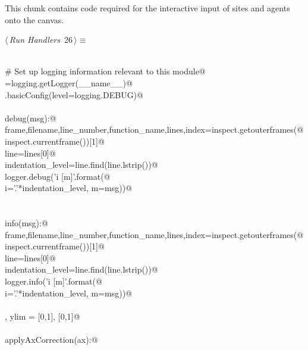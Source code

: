 \documentclass[10pt, english, oneside]{report}
\begin{document}
\begin{appendices}
This chunk contains code required for the interactive input of sites and agents onto the canvas. 

\begin{flushleft} \small\label{scrap25}\raggedright\small
{} $\langle\,${\itshape Run Handlers}\nobreak\ {\footnotesize {26}}$\,\rangle\equiv$
\vspace{-1ex}
\begin{list}{}{} \item
\mbox{}\verb@@\\
\mbox{}\verb@# Set up logging information relevant to this module@\\
\mbox{}\verb@logger=logging.getLogger(__name__)@\\
\mbox{}\verb@logging.basicConfig(level=logging.DEBUG)@\\
\mbox{}\verb@@\\
\mbox{}\verb@def debug(msg):@\\
\mbox{}\verb@    frame,filename,line_number,function_name,lines,index=inspect.getouterframes(@\\
\mbox{}\verb@        inspect.currentframe())[1]@\\
\mbox{}\verb@    line=lines[0]@\\
\mbox{}\verb@    indentation_level=line.find(line.lstrip())@\\
\mbox{}\verb@    logger.debug('{i} [{m}]'.format(@\\
\mbox{}\verb@        i='.'*indentation_level, m=msg))@\\
\mbox{}\verb@@\\
\mbox{}\verb@@\\
\mbox{}\verb@def info(msg):@\\
\mbox{}\verb@    frame,filename,line_number,function_name,lines,index=inspect.getouterframes(@\\
\mbox{}\verb@        inspect.currentframe())[1]@\\
\mbox{}\verb@    line=lines[0]@\\
\mbox{}\verb@    indentation_level=line.find(line.lstrip())@\\
\mbox{}\verb@    logger.info('{i} [{m}]'.format(@\\
\mbox{}\verb@        i='.'*indentation_level, m=msg))@\\
\mbox{}\verb@@\\
\mbox{}\verb@xlim, ylim = [0,1], [0,1]@\\
\mbox{}\verb@@\\
\mbox{}\verb@def applyAxCorrection(ax):@\\

\end{list}
\end{flushleft}
\end{appendices}
\end{document}
